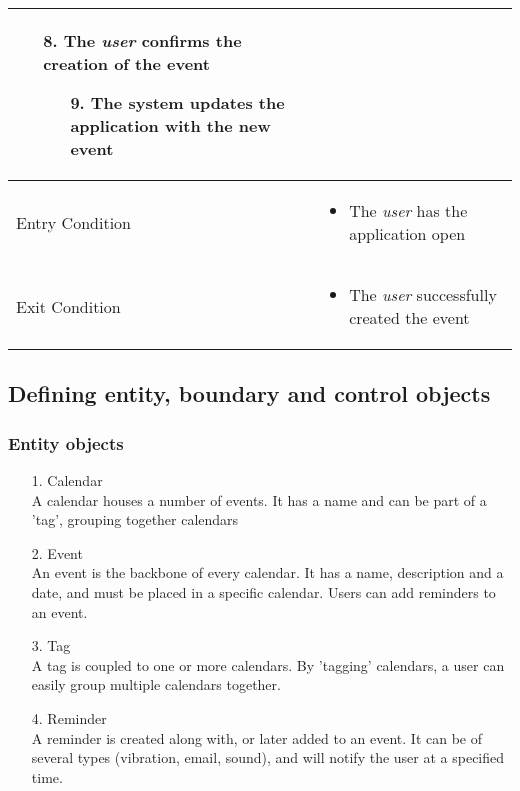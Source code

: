 \begin{center}
\begin{tabular}{ | l | p{10cm} |  }
\begin{enumerate}
						\item[8.] The \emph{user} confirms the creation of the event
						\begin{enumerate}
							\item[9.] The system updates the application with the new event
						\end{enumerate}
					\end{enumerate} \\ \hline
		Entry Condition & \begin{itemize}
						\item The \emph{user} has the application open
					\end{itemize} \\ \hline
		Exit Condition & \begin{itemize}
						\item The \emph{user} successfully created the event
					\end{itemize} \\
		\hline
	\end{tabular}
\end{center}

\subsection{Defining entity, boundary and control objects}

\subsubsection{Entity objects}

\begin{enumerate}
	\item[1.] Calendar \hfill \\
	A calendar houses a number of events. It has a name and can be part of a 'tag', grouping together calendars
	\item[2.] Event \hfill \\
	An event is the backbone of every calendar. It has a name, description and a date, and must be placed in a specific calendar. Users can add reminders to an event.
	\item[3.] Tag \hfill \\
	A tag is coupled to one or more calendars. By 'tagging' calendars, a user can easily group multiple calendars together.
	\item[4.] Reminder \hfill \\
	A reminder is created along with, or later added to an event. It can be of several types (vibration, email, sound), and will notify the user at a specified time.
\end{enumerate}


